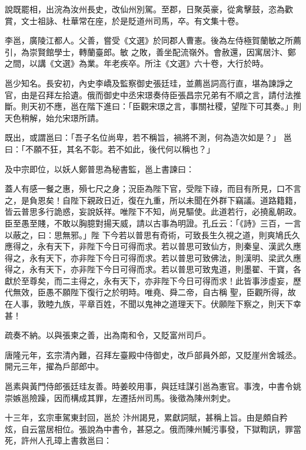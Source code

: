 \begin{pinyinscope}
 說既罷相，出浣為汝州長史，改仙州別駕。至郡，日聚英豪，從禽擊鼓，恣為歡賞，文士祖詠、杜華常在座，於是貶道州司馬，卒。有文集十卷。



 李邕，廣陵江都人。父善，嘗受《文選》於同郡人曹憲。後為左侍極賀蘭敏之所薦引，為崇賢館學士，轉蘭臺郎。敏
 之敗，善坐配流嶺外。會赦還，因寓居汴、鄭之間，以講《文選》為業。年老疾卒。所注《文選》六十卷，大行於時。



 邕少知名。長安初，內史李嶠及監察御史張廷珪，並薦邕詞高行直，堪為諫諍之官，由是召拜左拾遺。俄而御史中丞宋璟奏侍臣張昌宗兄弟有不順之言，請付法推斷。則天初不應，邕在階下進曰：「臣觀宋璟之言，事關社稷，望陛下可其奏。」則天色稍解，始允宋璟所請。



 既出，或謂邕曰：「吾子名位尚卑，若不稱旨，禍將不測，何為造次如是？」
 邕曰：「不願不狂，其名不彰。若不如此，後代何以稱也？」



 及中宗即位，以妖人鄭普思為秘書監，邕上書諫曰：



 蓋人有感一餐之惠，殞七尺之身；況臣為陛下官，受陛下祿，而目有所見，口不言之，是負恩矣！自陛下親政日近，復在九重，所以未聞在外群下竊議。道路籍籍，皆云普思多行詭惑，妄說妖祥。唯陛下不知，尚見驅使。此道若行，必撓亂朝政。臣至愚至賤，不敢以胸臆對揚天威，請以古事為明證。孔丘云：「《詩》三百，一言以蔽之，曰：思無邪。」陛
 下今若以普思有奇術，可致長生久視之道，則爽鳩氏久應得之，永有天下，非陛下今日可得而求。若以普思可致仙方，則秦皇、漢武久應得之，永有天下，亦非陛下今日可得而求。若以普思可致佛法，則漢明、梁武久應得之，永有天下，亦非陛下今日可得而求。若以普思可致鬼道，則墨翟、干寶，各獻於至尊矣，而二主得之，永有天下，亦非陛下今日可得而求！此皆事涉虛妄，歷代無效，臣愚不願陛下復行之於明時。唯堯、舜二帝，自古稱
 聖，臣觀所得，故在人事，敦睦九族，平章百姓，不聞以鬼神之道理天下。伏願陛下察之，則天下幸甚！



 疏奏不納。以與張柬之善，出為南和令，又貶富州司戶。



 唐隆元年，玄宗清內難，召拜左臺殿中侍御史，改戶部員外郎，又貶崖州舍城丞。開元三年，擢為戶部郎中。



 邕素與黃門侍郎張廷珪友善。時姜皎用事，與廷珪謀引邕為憲官。事洩，中書令姚崇嫉邕險躁，因而構成其罪，左遷括州司馬。後徵為陳州刺史。



 十三年，玄宗車駕東封回，邕於
 汴州謁見，累獻詞賦，甚稱上旨。由是頗自矜炫，自云當居相位。張說為中書令，甚惡之。俄而陳州贓污事發，下獄鞫訊，罪當死，許州人孔璋上書救邕曰：




\end{pinyinscope}
